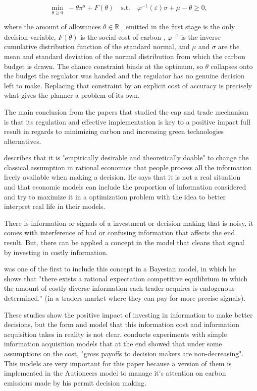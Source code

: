 \documentclass[a4paper,fleqn]{cas-dc}
\begin{document}
\begin{equation}\label{eq:subintro}
\min_{\theta \geq 0} \; -\theta \pi^a + F(\theta) \quad \text{s.t.} \quad \varphi^{-1}(\varepsilon)\sigma + \mu - \theta \geq 0 ,
\end{equation}

where the amount of allowances $\theta\in\mathbb{R}_+$ emitted in the first stage is the only decision variable, $F(\theta)$ is the social cost of carbon \citep{feijoo_design_2014}, $\varphi^{-1}$ is the inverse cumulative distribution function of the standard normal, and $\mu$ and $\sigma$ are the mean and standard deviation of the normal distribution from which the carbon budget is drawn. The chance constraint binds at the optimum, so $\theta$ collapses onto the budget the regulator was handed and the regulator has no genuine decision left to make. Replacing that constraint by an explicit cost of accuracy is precisely what gives the planner a problem of its own.

The main conclusion from the papers that studied the cap and trade mechanism is that its regulation and effective implementation is key to a positive impact full result in regards to minimizing carbon and increasing green technologies alternatives.  

\cite{gabaix_behavioral_2019} describes that it is "empirically desirable and theoretically doable" to change the classical assumption in rational economics that people process all the information freely available when making a decision. He says that it is not a real situation and that economic models can include the proportion of information considered and try to maximize it in a optimization problem with the idea to better interpret real life in their models. 

There is information or signals of a investment or decision making that is noisy, it comes with interference of bad or confusing  information that affects the end result. But, there can be applied a concept in the model that cleans that signal by investing in costly information.

\cite{verrecchia_information_1982} was one of the first to include this concept in a Bayesian model, in which he shows that "there exists a rational expectation competitive equilibrium in which the amount of costly diverse information each trader acquires is endogenous determined." (in a traders market where they can pay for more precise signals). 

These studies show the positive impact of investing in information to make better decisions, but the form and model that this information cost and information acquisition takes in reality is not clear. \cite{dewan_estimating_2020} conducts experiments with simple information acquisition models that at the end showed that under some assumptions on the cost, "gross payoffs to decision makers are non-decreasing". This models are very important for this paper because a version of them is implemented in the Autioneers model to manage it's attention on carbon emissions made by his permit decision making.  
\end{document}
